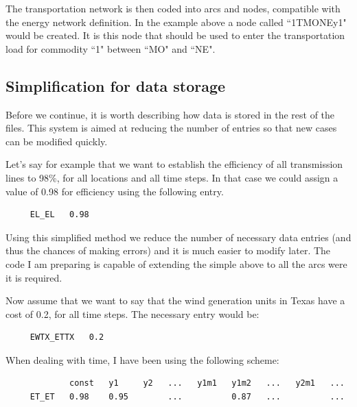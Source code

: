 \documentclass{article}
\begin{document}
The transportation network is then coded into arcs and nodes, compatible with the energy network definition. In the example above a node called ``1TMONEy1" would be created. It is this node that should be used to enter the transportation load for commodity ``1" between ``MO" and ``NE".


\subsection{Simplification for data storage}

Before we continue, it is worth describing how data is stored in the rest of the files. This system is aimed at reducing the number of entries so that new cases can be modified quickly.

Let's say for example that we want to establish the efficiency of all transmission lines to 98\%, for all locations and all time steps. In that case we could assign a value of 0.98 for efficiency using the following entry.

\begin{verbatim}
     EL_EL   0.98
\end{verbatim}

Using this simplified method we reduce the number of necessary data entries (and thus the chances of making errors) and it is much easier to modify later. The code I am preparing is capable of extending the simple above to all the arcs were it is required.

Now assume that we want to say that the wind generation units in Texas have a cost of 0.2, for all time steps. The necessary entry would be:
\begin{verbatim}
     EWTX_ETTX   0.2
\end{verbatim}

When dealing with time, I have been using the following scheme:

\begin{verbatim}
             const   y1     y2   ...   y1m1   y1m2   ...   y2m1   ...
     ET_ET   0.98    0.95        ...          0.87   ...          ...
\end{verbatim}
\end{document}
